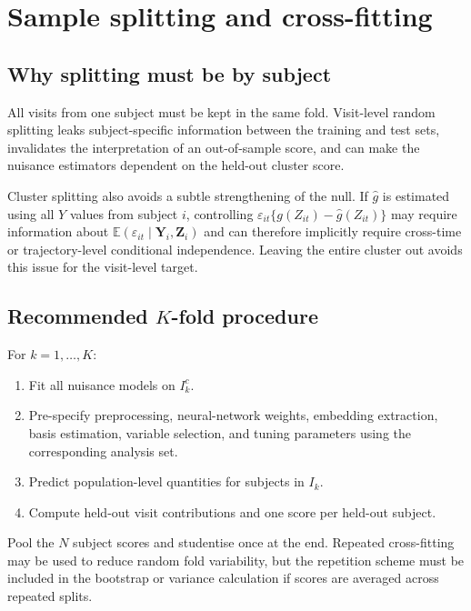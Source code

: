 \documentclass[11pt]{article}
\theoremstyle{definition}
\newcommand{\E}{\mathbb{E}}
\begin{document}
\section{Sample splitting and cross-fitting}

\subsection{Why splitting must be by subject}

All visits from one subject must be kept in the same fold. Visit-level random splitting leaks
subject-specific information between the training and test sets, invalidates the interpretation
of an out-of-sample score, and can make the nuisance estimators dependent on the held-out
cluster score.

Cluster splitting also avoids a subtle strengthening of the null. If $\widehat g$ is estimated
using all $Y$ values from subject $i$, controlling
$\varepsilon_{it}\{g(Z_{it})-\widehat g(Z_{it})\}$ may require information about
$\E(\varepsilon_{it}\mid\mathbf Y_i,\mathbf Z_i)$ and can therefore implicitly require
cross-time or trajectory-level conditional independence. Leaving the entire cluster out avoids
this issue for the visit-level target.

\subsection{Recommended \texorpdfstring{$K$}{K}-fold procedure}

For $k=1,\ldots,K$:
\begin{enumerate}[leftmargin=*]
\item Fit all nuisance models on $I_k^c$.
\item Pre-specify preprocessing, neural-network weights, embedding extraction, basis
estimation, variable selection, and tuning parameters using the corresponding analysis set.
\item Predict population-level quantities for subjects in $I_k$.
\item Compute held-out visit contributions and one score per held-out subject.
\end{enumerate}
Pool the $N$ subject scores and studentise once at the end. Repeated cross-fitting may be used
to reduce random fold variability, but the repetition scheme must be included in the bootstrap
or variance calculation if scores are averaged across repeated splits.
\end{document}
